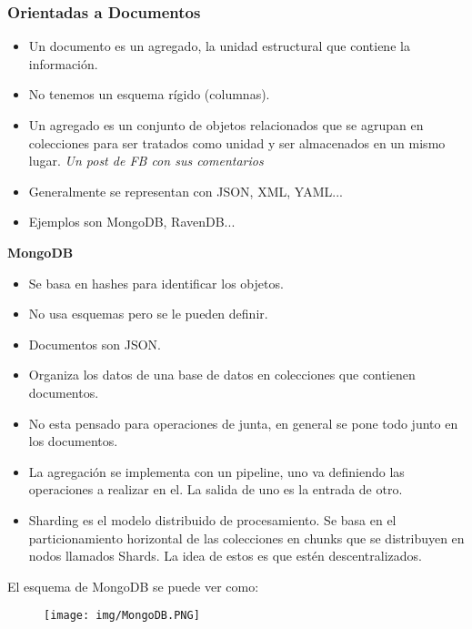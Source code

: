 \subsubsection*{Orientadas a Documentos}

\begin{itemize}
\item Un documento es un agregado, la unidad estructural que contiene la información. 
\item No tenemos un esquema rígido (columnas).
\item Un agregado es un conjunto de objetos relacionados que se agrupan en colecciones para ser tratados como unidad y ser almacenados en un mismo lugar. \textit{Un post de FB con sus comentarios}
\item Generalmente se representan con JSON, XML, YAML...
\item Ejemplos son MongoDB, RavenDB...
\end{itemize}


\bigskip
\textbf{MongoDB}\\
\begin{itemize}
\item Se basa en hashes para identificar los objetos.
\item No usa esquemas pero se le pueden definir.
\item Documentos son JSON.
\item Organiza los datos de una base de datos en colecciones que contienen documentos.
\item No esta pensado para operaciones de junta, en general se pone todo junto en los documentos.
\item La agregación se implementa con un pipeline, uno va definiendo las operaciones a realizar en el. La salida de uno es la entrada de otro.
\item Sharding es el modelo distribuido de procesamiento. Se basa en el particionamiento horizontal de las colecciones en chunks que se distribuyen en nodos llamados Shards. La idea de estos es que estén descentralizados.
\end{itemize}

El esquema de MongoDB se puede ver como:
\begin{figure}[!htb]
    \centering
    \texttt{[image: img/MongoDB.PNG]}
\end{figure}


